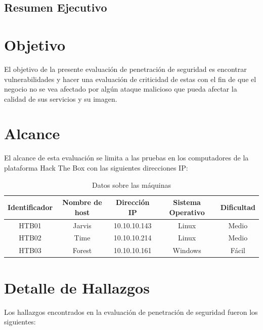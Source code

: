 \documentclass[a4paper]{article}
\begin{document}
    
    \clearpage
        \tableofcontents
    \clearpage
    \listoffigures
    \clearpage
    \cfoot{\thepage}
    \setcounter{page}{1}
    \begin{center}
        \section*{Resumen Ejecutivo}
    \end{center}
    \vspace{0.1cm}

    \clearpage
    \section{Objetivo}
        \large{El objetivo de la presente evaluación de penetración de seguridad es encontrar vulnerabilidades y hacer una evaluación de criticidad de estas con el fin de que el negocio no se vea afectado por algún ataque malicioso que pueda afectar la calidad de sus servicios y su imagen.}
        \par
    \section{Alcance}
        \large{El alcance de esta evaluación se limita a las pruebas en los computadores de la plataforma Hack The Box con las siguientes direcciones IP:}
        \par
        \begin{table}[h]
            \centering
                \begin{tabular}{|c|c|c|c|c|} \hline
                    Identificador & Nombre de host & Dirección IP & Sistema Operativo & Dificultad \\ \hline
                    HTB01 & Jarvis & 10.10.10.143 & Linux & Medio \\ \hline
                    HTB02 & Time & 10.10.10.214 & Linux & Medio \\ \hline
                    HTB03 & Forest & 10.10.10.161 & Windows & Fácil \\ \hline
                \end{tabular}
                \caption{Datos sobre las máquinas}
        \end{table}
        \par
    \section{Detalle de Hallazgos}
        \large{Los hallazgos encontrados en la evaluación de penetración de seguridad fueron los siguientes:}
        \par
        \vspace{0.1cm}
\end{document}
